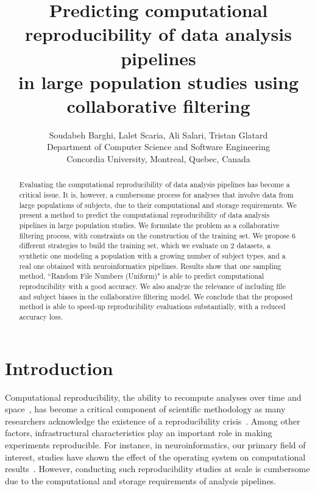 \documentclass[10pt, conference, compsocconf]{IEEEtran}
\begin{document}
\title{Predicting computational reproducibility of data analysis pipelines \\in large population studies using collaborative filtering}

\author{Soudabeh Barghi, Lalet Scaria, Ali Salari, Tristan Glatard\\
  Department of Computer Science and Software Engineering\\ Concordia University, Montreal, Quebec, Canada}

\maketitle

\begin{abstract}
Evaluating the 
computational reproducibility of data analysis pipelines has become a 
critical issue. It is, however, a cumbersome 
process for analyses that involve data from large populations of 
subjects, due to their computational and storage requirements. 
We present a method to predict the computational 
reproducibility of data analysis pipelines in large population studies. 
We formulate the problem as a collaborative filtering process, with 
constraints on the construction of the training set. We propose 6 
different strategies to build the training set, which we evaluate on 2 
datasets, a synthetic one modeling a population with a growing number 
of subject types, and a real one obtained with neuroinformatics 
pipelines. Results show that one sampling method, ``Random File Numbers 
(Uniform)" is able to predict computational reproducibility with a good 
accuracy. We also analyze the relevance of including file and subject 
biases in the collaborative filtering model. We conclude that the 
proposed method is able to speed-up reproducibility 
evaluations substantially, with a reduced accuracy loss.
\end{abstract}

\section{Introduction}

Computational reproducibility, the ability to recompute analyses 
over time and 
space~\cite{peng2011reproducible}, has become a critical component of 
scientific methodology as many researchers acknowledge the existence of 
a reproducibility crisis~\cite{baker2016there}. Among other factors, infrastructural 
characteristics play an important role in making experiments 
reproducible. For 
instance, in 
neuroinformatics, our primary field of interest, studies have 
shown the effect of the 
operating system on computational 
results~\cite{gronenschild2012effects, glatard2015reproducibility}.
However, conducting such reproducibility studies at scale is cumbersome 
due to the computational and storage requirements of analysis 
pipelines.
\end{document}
